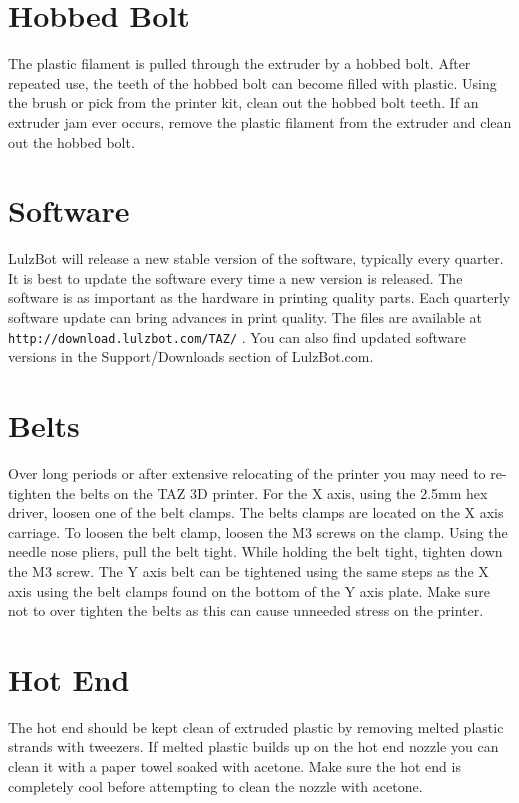 \section{Hobbed Bolt}
The plastic filament is pulled through the extruder by a hobbed bolt. After repeated use, the teeth of the hobbed bolt can become filled with plastic. Using the brush or pick from the printer kit, clean out the hobbed bolt teeth. If an extruder jam ever occurs, remove the plastic filament from the extruder and clean out the hobbed bolt.

\section{Software}
LulzBot will release a new stable version of the software, typically every quarter. It is best to update the software every time a new version is released. The software is as important as the hardware in printing quality parts. Each quarterly software update can bring advances in print quality. The files are available at \texttt{http://download.lulzbot.com/TAZ/} . You can also find updated software versions in the Support/Downloads section of LulzBot.com.

\section{Belts}
Over long periods or after extensive relocating of the printer you may need to re-tighten the belts on the TAZ 3D printer. For the X axis, using the 2.5mm hex driver, loosen one of the belt clamps. The belts clamps are located on the X axis carriage. To loosen the belt clamp, loosen the M3 screws on the clamp. Using the needle nose pliers, pull the belt tight. While holding the belt tight, tighten down the M3 screw. The Y axis belt can be tightened using the same steps as the X axis using the belt clamps found on the bottom of the Y axis plate. Make sure not to over tighten the belts as this can cause unneeded stress on the printer.

\section{Hot End}
The hot end should be kept clean of extruded plastic by removing melted plastic strands with tweezers. If melted plastic builds up on the hot end nozzle you can clean it with a paper towel soaked with acetone. Make sure the hot end is completely cool before attempting to clean the nozzle with acetone.

